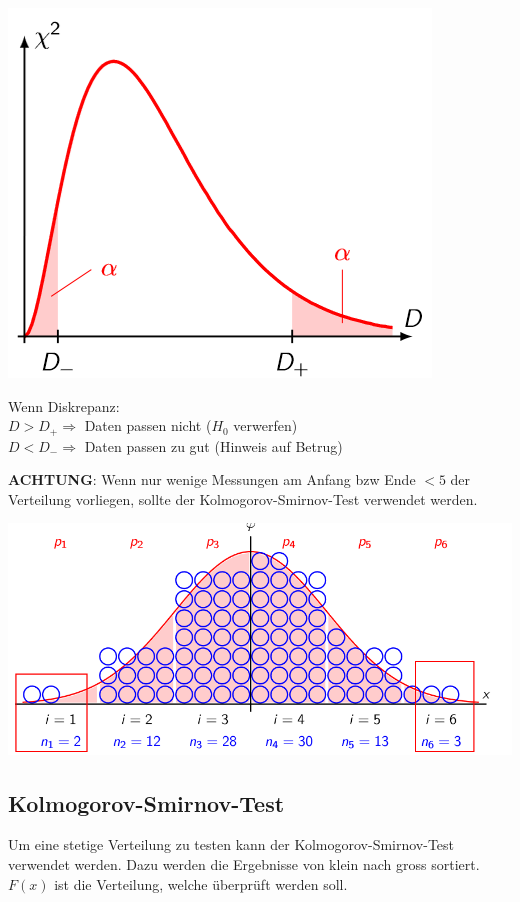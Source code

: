 \begin{center}
	\begin{minipage}{0.20\textwidth}
		\includegraphics[width=0.9\columnwidth]{Images/chi-verteilung}
	\end{minipage}%
	\begin{minipage}{0.3\textwidth}
		 Wenn Diskrepanz: \\
		 $D>D_+ \Rightarrow$ Daten passen nicht ($H_0$ verwerfen)\\
		 $D < D_- \Rightarrow$ Daten passen zu gut (Hinweis auf Betrug)
	\end{minipage}
\end{center}
\noindent\textbf{ACHTUNG}: Wenn nur wenige Messungen am Anfang bzw Ende $<5$ der Verteilung vorliegen, sollte der Kolmogorov-Smirnov-Test verwendet werden.
\begin{center}
	\includegraphics[width=0.6\columnwidth]{Images/chi-verteilung-fail}
\end{center}

\subsection{Kolmogorov-Smirnov-Test}
Um eine stetige Verteilung zu testen kann der Kolmogorov-Smirnov-Test verwendet werden. Dazu werden die Ergebnisse von klein nach gross sortiert. $F(x)$ ist die Verteilung, welche überprüft werden soll. 

